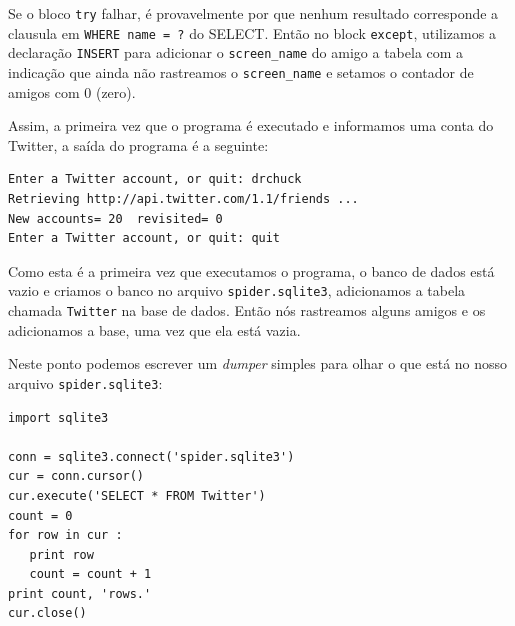 
Se o bloco {\tt try} falhar, é provavelmente por que nenhum resultado
corresponde a clausula em {\tt WHERE name = ?} do SELECT. Então no block
{\tt except}, utilizamos a declaração {\tt INSERT} para adicionar o
\verb"screen_name" do amigo a tabela com a indicação que ainda não rastreamos
o \verb"screen_name" e setamos o contador de amigos com 0 (zero).


Assim, a primeira vez que o programa é executado e informamos uma conta do
Twitter, a saída do programa é a seguinte:

\beforeverb
\begin{verbatim}
Enter a Twitter account, or quit: drchuck
Retrieving http://api.twitter.com/1.1/friends ...
New accounts= 20  revisited= 0
Enter a Twitter account, or quit: quit
\end{verbatim}
\afterverb
%

Como esta é a primeira vez que executamos o programa, o banco de dados está
vazio e criamos o banco no arquivo {\tt spider.sqlite3}, adicionamos a tabela
chamada {\tt Twitter} na base de dados. Então nós rastreamos alguns amigos e
os adicionamos a base, uma vez que ela está vazia.


Neste ponto podemos escrever um {\it dumper} simples para olhar o que está no
nosso arquivo {\tt spider.sqlite3}:

\beforeverb
\begin{verbatim}
import sqlite3

conn = sqlite3.connect('spider.sqlite3')
cur = conn.cursor()
cur.execute('SELECT * FROM Twitter')
count = 0
for row in cur :
   print row
   count = count + 1
print count, 'rows.'
cur.close()
\end{verbatim}
\afterverb
%

